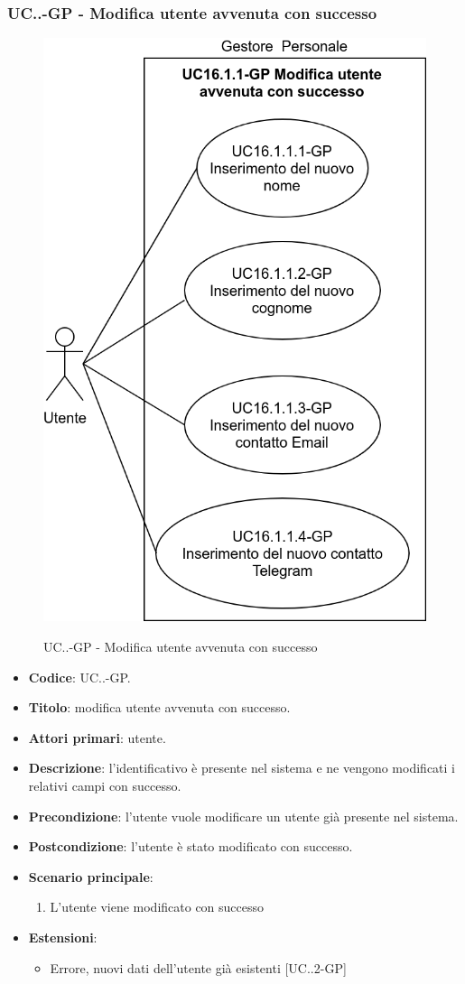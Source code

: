 		\subsubsection{UC\theuccount.\thesubuccount.\thesubsubuccount-GP - Modifica utente avvenuta con successo}
			\begin{figure}[H]
				\centering
				\includegraphics[width=0.6\columnwidth]{img/casi_d'uso/UC16_1_1.png}\\
				\caption{UC\theuccount.\thesubuccount.\thesubsubuccount-GP - Modifica utente avvenuta con successo}
			\end{figure}
			\begin{itemize}
				\item \textbf{Codice}: UC\theuccount.\thesubuccount.\thesubsubuccount-GP.
				\item \textbf{Titolo}: modifica utente avvenuta con successo.
				\item \textbf{Attori primari}: utente.
				\item \textbf{Descrizione}: l'identificativo è presente nel sistema e ne vengono modificati i relativi campi con successo.
				\item \textbf{Precondizione}: l'utente vuole modificare un utente già presente nel sistema.
				\item \textbf{Postcondizione}: l'utente è stato modificato con successo.
				\item \textbf{Scenario principale}:
				\begin{enumerate}
					\item L'utente viene modificato con successo
				\end{enumerate}
				\item \textbf{Estensioni}:
				\begin{itemize}
					\item Errore, nuovi dati dell'utente già esistenti [UC\theuccount.\thesubuccount.2-GP]
				\end{itemize}
			\end{itemize}
			
